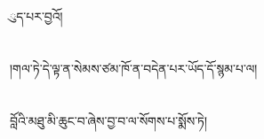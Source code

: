 ུད་པར་བྱའོ།\chapter{ }།གལ་ཏེ་དེ་ལྟ་ན་སེམས་ཙམ་ཁོ་ན་བདེན་པར་ཡོད་དོ་སྙམ་པ་ལ།\chapter{ }བློའི་མཐུ་མི་ཆུང་བ་ཞེས་བྱ་བ་ལ་སོགས་པ་སྨོས་ཏེ།\chapte